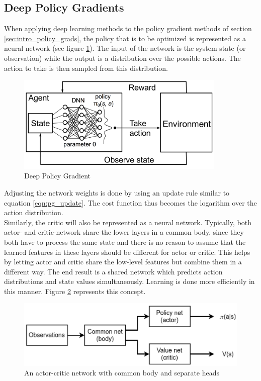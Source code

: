 \subsection{Deep Policy Gradients}
\label{sec:deep_pg}
When applying deep learning methods to the policy gradient methods of section \ref{sec:intro_policy_grads}, the policy that is to be optimized is represented as a neural network (see figure \ref{fig:deep_pg}). The input of the network is the system state (or observation) while the output is a distribution over the possible actions. The action to take is then sampled from this distribution.
\begin{figure}[htp]
    \centering
    \includegraphics[width=10cm]{images/deep_pg.png}
    \caption{Deep Policy Gradient}
    \label{fig:deep_pg}
\end{figure}
Adjusting the network weights is done by using an update rule similar to equation \ref{eqn:pg_update}. The cost function thus becomes the logarithm over the action distribution.\\
Similarly, the critic will also be represented as a neural network. Typically, both actor- and critic-network share the lower layers in a common body, since they both have to process the same state and there is no reason to assume that the learned features in these layers should be different for actor or critic. This helps by letting actor and critic share the low-level features but combine them in a different way. The end result is a shared network which predicts action distributions and state values simultaneously. Learning is done more efficiently in this manner. Figure \ref{fig:common_body} represents this concept.

\begin{figure}[htp]
    \centering
    \includegraphics[width=12cm]{images/common_body.png}
    \caption{An actor-critic network with common body and separate heads}
    \label{fig:common_body}
\end{figure}

